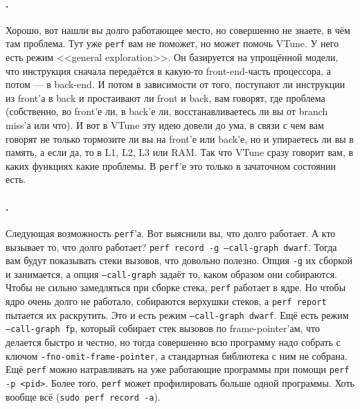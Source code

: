 \documentclass{article}
\begin{document}
    \paragraph{.}
    Хорошо, вот нашли вы долго работающее место, но совершенно не знаете, в чём там проблема. Тут уже \texttt{perf} вам не поможет, но может помочь VTune. У него есть режим <<general exploration>>. Он базируется на упрощённой модели, что инструкция сначала передаётся в какую-то front-end-часть процессора, а потом --- в back-end. И потом в зависимости от того, поступают ли инструкции из front'а в back и простаивают ли front и back, вам говорят, где проблема (собственно, во front'е ли, в back'е ли, восстанавливаетесь ли вы от branch miss'а или что). И вот в VTune эту идею довели до ума, в связи с чем вам говорят не только тормозите ли вы на front'е или back'е, но и упираетесь ли вы в память, а если да, то в L1, L2, L3 или RAM. Так что VTune сразу говорит вам, в каких функциях какие проблемы. В \texttt{perf}'е это только в зачаточном состоянии есть.
    \paragraph{.}
    Следующая возможность \texttt{perf}'а. Вот выяснили вы, что долго работает. А кто вызывает то, что долго работает? \texttt{perf record -g --call-graph dwarf}. Тогда вам будут показывать стеки вызовов, что довольно полезно. Опция \texttt{-g} их сборкой и занимается, а опция \texttt{--call-graph} задаёт то, каком образом они собираются. Чтобы не сильно замедляться при сборке стека, \texttt{perf} работает в ядре. Но чтобы ядро очень долго не работало, собираются верхушки стеков, а \texttt{perf report} пытается их раскрутить. Это и есть режим \texttt{--call-graph dwarf}. Ещё есть режим \texttt{--call-graph fp}, который собирает стек вызовов по frame-pointer'ам, что делается быстро и честно, но тогда совершенно всю программу надо собрать с ключом \texttt{-fno-omit-frame-pointer}, а стандартная библиотека с ним не собрана.\\
    Ещё \texttt{perf} можно натравливать на уже работающие программы при помощи \texttt{perf -p <pid>}. Более того, \texttt{perf} может профилировать больше одной программы. Хоть вообще всё (\texttt{sudo perf record -a}).
\end{document}
